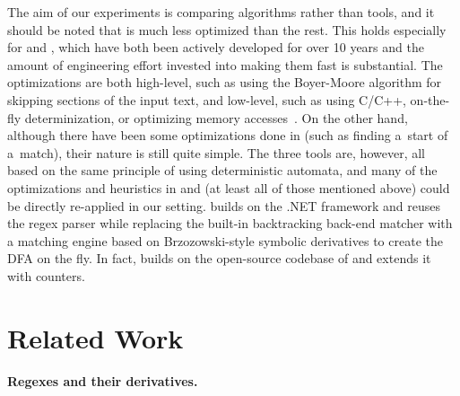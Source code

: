 \documentclass[acmsmall,screen]{acmart}
\begin{document}
The aim of our experiments is comparing algorithms rather than tools, and it should
be noted that \catool is much less optimized than the rest.
This holds especially for \retwo and \grep, which have both been actively
developed for over 10 years and the amount of engineering effort invested into
making them fast is substantial.
%
The optimizations are both high-level, such as using the Boyer-Moore algorithm
for skipping sections of the input text, and low-level, such as using C/C++,
on-the-fly determinization, or optimizing memory accesses~\cite{regexes-in-the-wild,
why-gnu-grep-is-fast}. 
%
On the other hand,
although there have been some optimizations done in 
\catool (such as finding a~start of a~match), their nature is still quite
simple.
The three tools are, however, all based on the same principle of using
deterministic automata, and many of the optimizations
and heuristics in \retwo and \grep (at least all of those mentioned above) could
be directly re-applied in our setting.
\srm builds on the .NET framework and reuses the \dotnet regex parser
while replacing the built-in backtracking back-end matcher with a
matching engine based on Brzozowski-style symbolic derivatives to create
the DFA on the fly.
In fact, \catool builds on the open-source codebase of \srm and extends it with counters.


\section{Related Work}\label{sec:related}

\paragraph{Regexes and their derivatives.}
\end{document}
